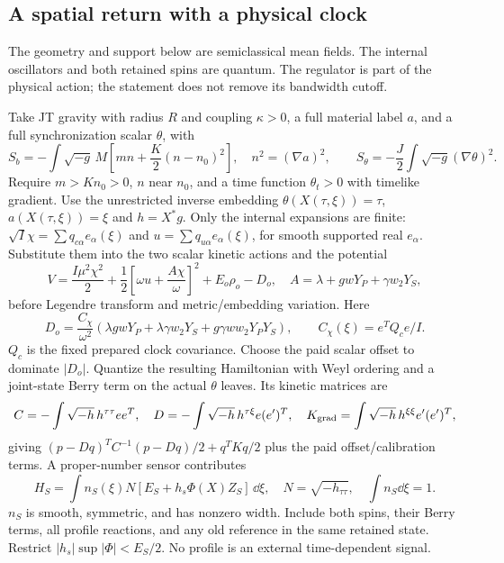 \subsection{A spatial return with a physical clock}
\label{app:finite-spatial-return}

The geometry and support below are semiclassical mean fields. The internal
oscillators and both retained spins are quantum. The regulator is part of
the physical action; the statement does not remove its bandwidth cutoff.

Take JT gravity with radius $R$ and coupling $\kappa>0$, a full material
label $a$, and a full synchronization scalar $\theta$, with
\begin{equation}
 S_b=-\int\sqrt{-g}\,M\left[mn+\frac K2(n-n_0)^2\right],\quad
 n^2=(\nabla a)^2,\qquad
 S_\theta=-\frac J2\int\sqrt{-g}(\nabla\theta)^2.                 \label{eq:finite-spatial-1}
\end{equation}
Require $m>Kn_0>0$, $n$ near $n_0$, and a time function
$\theta_t>0$ with timelike gradient. Use the unrestricted inverse embedding
$\theta(X(\tau,\xi))=\tau$, $a(X(\tau,\xi))=\xi$ and
$h=X^*g$. Only the internal expansions are finite:
$\sqrt I\chi=\sum q_{c\alpha}e_\alpha(\xi)$ and
$u=\sum q_{u\alpha}e_\alpha(\xi)$, for smooth supported real $e_\alpha$.
Substitute them into the two scalar kinetic actions and the potential
\begin{equation}
 V=\frac{I\mu^2\chi^2}{2}
   +\frac12\left[\omega u+\frac{A\chi}{\omega}\right]^2
   +E_o\rho_o-D_o,
 \quad A=\lambda+gwY_P+\gamma w_2Y_S,                         \label{eq:finite-spatial-2}
\end{equation}
before Legendre transform and metric/embedding variation. Here
\[
 D_o=\frac{C_\chi}{\omega^2}
 (\lambda gwY_P+\lambda\gamma w_2Y_S+g\gamma ww_2Y_PY_S),
 \qquad C_\chi(\xi)=e^TQ_ce/I .
\]
$Q_c$ is the fixed prepared clock covariance. Choose the paid scalar
offset to dominate $|D_o|$. Quantize the resulting Hamiltonian with Weyl
ordering and a joint-state Berry term on the actual $\theta$ leaves. Its
kinetic matrices are
\[
 C=-\int\sqrt{-h}\,h^{\tau\tau}ee^T,\quad
 D=-\int\sqrt{-h}\,h^{\tau\xi}e(e')^T,\quad
 K_{\rm grad}=\int\sqrt{-h}\,h^{\xi\xi}e'(e')^T,
\]
giving $(p-Dq)^TC^{-1}(p-Dq)/2+q^TKq/2$ plus the paid
offset/calibration terms. A proper-number sensor contributes
\begin{equation}
 H_S=\int n_S(\xi)N[E_S+h_s\Phi(X)Z_S]\,\dd\xi,
 \quad N=\sqrt{-h_{\tau\tau}},\quad \int n_S\dd\xi=1.        \label{eq:finite-spatial-3}
\end{equation}
$n_S$ is smooth, symmetric, and has nonzero width. Include both spins,
their Berry terms, all profile reactions, and any old reference in the
same retained state. Restrict $|h_s|\sup|\Phi|<E_S/2$. No profile is an
external time-dependent signal.

